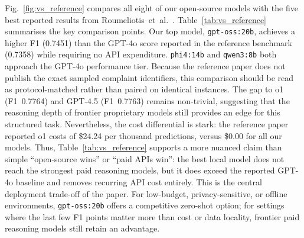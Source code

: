 \documentclass[journal]{IEEEtran}
\begin{document}
Fig.~\ref{fig:vs_reference} compares all eight of our open-source models
with the five best reported results from Roumeliotis~et~al.\
\cite{roumeliotis2025think}. Table~\ref{tab:vs_reference} summarises
the key comparison points. Our top model, \texttt{gpt-oss:20b},
achieves a higher F1 (0.7451) than the GPT-4o score reported in the
reference benchmark (0.7358) while requiring no API expenditure.
\texttt{phi4:14b} and \texttt{qwen3:8b} both approach the GPT-4o
performance tier. Because the reference paper does not publish the
exact sampled complaint identifiers, this comparison should be read
as protocol-matched rather than paired on identical instances. The
gap to o1 (F1~0.7764) and GPT-4.5 (F1~0.7763) remains non-trivial,
suggesting that the reasoning depth of frontier proprietary models
still provides an edge for this structured task. Nevertheless, the
cost differential is stark: the reference paper reported o1 costs of
\$24.24 per thousand predictions, versus \$0.00 for all our models.
Thus, Table~\ref{tab:vs_reference} supports a more nuanced claim than
simple ``open-source wins'' or ``paid APIs win'': the best local model
does not reach the strongest paid reasoning models, but it does exceed
the reported GPT-4o baseline and removes recurring API cost entirely.
This is the central deployment trade-off of the paper. For low-budget,
privacy-sensitive, or offline environments, \texttt{gpt-oss:20b} offers
a competitive zero-shot option; for settings where the last few F1
points matter more than cost or data locality, frontier paid reasoning
models still retain an advantage.
\end{document}
